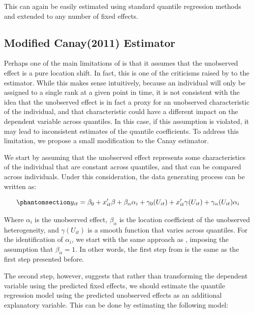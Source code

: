 \documentclass[bib]{statapress}
\begin{document}
This can again be easily estimated using standard quantile regression
methods and extended to any number of fixed effects.

\subsection{Modified Canay(2011) Estimator}\label{sec-mcanay}

Perhaps one of the main limitations of \citet{canay2011} is that it
assumes that the unobserved effect is a pure location shift. In fact,
this is one of the criticisms raised by \citet{mss2019} to the
estimator. While this makes sense intuitively, because an individual
will only be assigned to a single rank at a given point in time, it is
not consistent with the idea that the unobserved effect is in fact a
proxy for an unobserved characteristic of the individual, and that
characteristic could have a different impact on the dependent variable
across quantiles. In this case, if this assumption is violated, it may
lead to inconsistent estimates of the quantile coefficients. To address
this limitation, we propose a small modification to the Canay estimator.

We start by assuming that the unobserved effect represents some
characteristics of the individual that are constant across quantiles,
and that can be compared across individuals. Under this consideration,
the data generating process can be written as:

\begin{equation}\phantomsection\label{eq-mcanay-dgp}{y_{it} =\beta_0 +   x_{it}'\beta + \beta_\alpha \alpha_i+
\gamma_0(U_{it}) +  x_{it}'\gamma(U_{it}) + \gamma_\alpha(U_{it}) \alpha_i
}\end{equation}

Where \(\alpha_i\) is the unobserved effect, \(\beta_\alpha\) is the
location coefficient of the unobserved heterogeneity, and
\(\gamma(U_{it})\) is a smooth function that varies across quantiles.
For the identification of \(\alpha_i\), we start with the same approach
as \citet{canay2011}, imposing the assumption that \(\beta_\alpha=1\).
In other words, the first step from \citet{canay2011} is the same as the
first step presented before.

The second step, however, suggests that rather than transforming the
dependent variable using the predicted fixed effects, we should estimate
the quantile regression model using the predicted unobserved effects as
an additional explanatory variable. This can be done by estimating the
following model:
\end{document}
